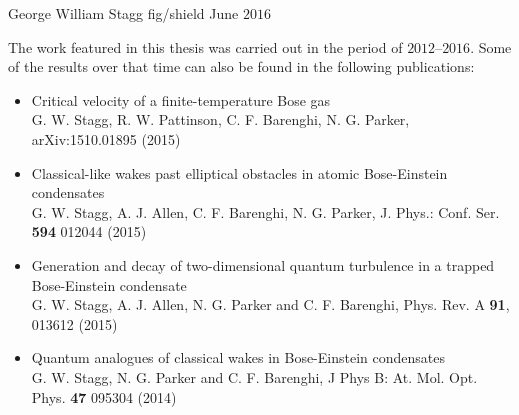 \documentclass[11pt]{report}
\begin{document}
           {George William Stagg}       %
           {fig/shield}                 %
           {June $2016$}                %

  \thispagestyle{empty}
  \cleardoublepage
  \newpage
  \thispagestyle{empty}
  \noindent The work featured in this thesis was carried out in the period of $2012$--$2016$. Some of the results over that time can also be found in the following publications:
  \begin{itemize}
  \item Critical velocity of a finite-temperature Bose gas\\
  {\footnotesize G. W. Stagg, R. W. Pattinson, C. F. Barenghi, N. G. Parker, arXiv:1510.01895 (2015)}
  \item Classical-like wakes past elliptical obstacles in atomic Bose-Einstein condensates\\
  {\footnotesize G. W. Stagg, A. J. Allen, C. F. Barenghi, N. G. Parker, J. Phys.: Conf. Ser. {\bf 594} 012044 (2015)}
  \item Generation and decay of two-dimensional quantum turbulence in a trapped Bose-Einstein condensate\\
  {\footnotesize G. W. Stagg, A. J. Allen, N. G. Parker and C. F. Barenghi, Phys. Rev. A {\bf 91}, 013612 (2015)}
  \item Quantum analogues of classical wakes in Bose-Einstein condensates\\
  {\footnotesize G. W. Stagg, N. G. Parker and C. F. Barenghi, J Phys B: At. Mol. Opt. Phys. {\bf 47} 095304 (2014)}
  \end{itemize}
  \newpage
  \clearpage
  \thispagestyle{empty}
  \cleardoublepage
  \tableofcontents



  \clearpage                            %
  \thispagestyle{empty}                 %
  \cleardoublepage                      %

\end{document}
